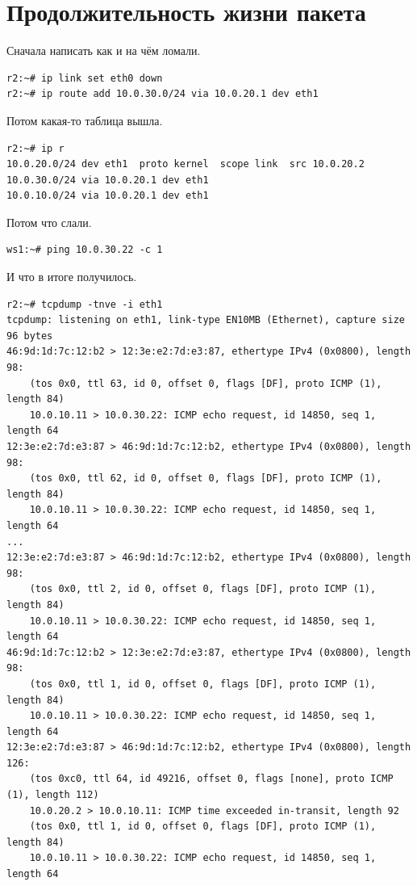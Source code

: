 \documentclass[a4paper,12pt]{article}
\begin{document}
\section{Продолжительность жизни пакета}

Сначала написать как и на чём ломали. 

\begin{Verbatim}
r2:~# ip link set eth0 down
r2:~# ip route add 10.0.30.0/24 via 10.0.20.1 dev eth1
\end{Verbatim}

Потом какая-то таблица вышла.

\begin{Verbatim}
r2:~# ip r
10.0.20.0/24 dev eth1  proto kernel  scope link  src 10.0.20.2 
10.0.30.0/24 via 10.0.20.1 dev eth1 
10.0.10.0/24 via 10.0.20.1 dev eth1 
\end{Verbatim}

Потом что слали.

\begin{Verbatim}
ws1:~# ping 10.0.30.22 -c 1
\end{Verbatim}

И что в итоге получилось.

\begin{Verbatim}
r2:~# tcpdump -tnve -i eth1
tcpdump: listening on eth1, link-type EN10MB (Ethernet), capture size 96 bytes
46:9d:1d:7c:12:b2 > 12:3e:e2:7d:e3:87, ethertype IPv4 (0x0800), length 98: 
	(tos 0x0, ttl 63, id 0, offset 0, flags [DF], proto ICMP (1), length 84) 
	10.0.10.11 > 10.0.30.22: ICMP echo request, id 14850, seq 1, length 64
12:3e:e2:7d:e3:87 > 46:9d:1d:7c:12:b2, ethertype IPv4 (0x0800), length 98: 
	(tos 0x0, ttl 62, id 0, offset 0, flags [DF], proto ICMP (1), length 84) 
	10.0.10.11 > 10.0.30.22: ICMP echo request, id 14850, seq 1, length 64
...
12:3e:e2:7d:e3:87 > 46:9d:1d:7c:12:b2, ethertype IPv4 (0x0800), length 98: 
	(tos 0x0, ttl 2, id 0, offset 0, flags [DF], proto ICMP (1), length 84) 
	10.0.10.11 > 10.0.30.22: ICMP echo request, id 14850, seq 1, length 64
46:9d:1d:7c:12:b2 > 12:3e:e2:7d:e3:87, ethertype IPv4 (0x0800), length 98: 
	(tos 0x0, ttl 1, id 0, offset 0, flags [DF], proto ICMP (1), length 84) 
	10.0.10.11 > 10.0.30.22: ICMP echo request, id 14850, seq 1, length 64
12:3e:e2:7d:e3:87 > 46:9d:1d:7c:12:b2, ethertype IPv4 (0x0800), length 126: 
	(tos 0xc0, ttl 64, id 49216, offset 0, flags [none], proto ICMP (1), length 112) 
	10.0.20.2 > 10.0.10.11: ICMP time exceeded in-transit, length 92
	(tos 0x0, ttl 1, id 0, offset 0, flags [DF], proto ICMP (1), length 84) 
	10.0.10.11 > 10.0.30.22: ICMP echo request, id 14850, seq 1, length 64


\end{Verbatim}
\end{document}
